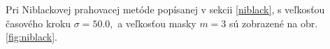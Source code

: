 \documentclass[a4paper,12pt,twoside]{article}%
\begin{document}
Pri Niblackovej prahovacej metóde popísanej v sekcii \ref{niblack}, s veľkosťou časového kroku $\sigma = 50.0,$ a veľkosťou masky $m = 3$ sú zobrazené na obr. \ref{fig:niblack}. 

\begin{figure}[H]  
    \hspace{5px}

\end{figure}
\end{document}
